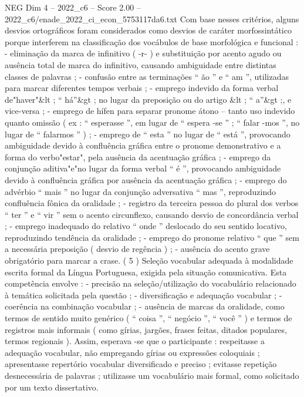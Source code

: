 \begin{textsample}{NEG Dim 4 – 2022\_c6 – Score 2.00 – 2022\_c6/enade\_2022\_ci\_econ\_5753117da6.txt}
Com base nesses critérios, alguns desvios ortográficos foram considerados como desvios de caráter morfossintático porque interferem na classificação dos vocábulos de base morfológica e funcional : - eliminação da marca de infinitivo ( -r- ) e substituição por acento agudo ou ausência total de marca do infinitivo, causando ambiguidade entre distintas classes de palavras ; - confusão entre as terminações “ ão ” e “ am ”, utilizadas para marcar diferentes tempos verbais ; - emprego indevido da forma verbal de"haver"\&lt ; “ há”\&gt ; no lugar da preposição ou do artigo \&lt ; “ a”\&gt ;, e vice-versa ; - emprego de hífen para separar pronome átono – tanto uso indevido quanto omissão ( ex : “ esperasse ”, em lugar de “ espera -se ” ; “ falar -mos ”, no lugar de “ falarmos ” ) ; - emprego de “ esta ” no lugar de “ está ”, provocando ambiguidade devido à confluência gráfica entre o pronome demonstrativo e a forma do verbo"estar", pela ausência da acentuação gráfica ; - emprego da conjunção aditiva"e"no lugar da forma verbal “ é ”, provocando ambiguidade devido à confluência gráfica por ausência da acentuação gráfica ; - emprego do advérbio “ mais ” no lugar da conjunção adversativa “ mas ”, reproduzindo confluência fônica da oralidade ; - registro da terceira pessoa do plural dos verbos “ ter ” e “ vir ” sem o acento circunflexo, causando desvio de concordância verbal ; - emprego inadequado do relativo “ onde ” deslocado do seu sentido locativo, reproduzindo tendência da oralidade ; - emprego do pronome relativo “ que ” sem a necessária preposição ( desvio de regência ) ; - ausência do acento grave obrigatório para marcar a crase. ( 5 ) Seleção vocabular adequada à modalidade escrita formal da Língua Portuguesa, exigida pela situação comunicativa.
Esta competência envolve : - precisão na seleção/utilização do vocabulário relacionado à temática solicitada pela questão ; - diversificação e adequação vocabular ; - coerência na combinação vocabular ; - ausência de marcas da oralidade, como termos de sentido muito genérico ( “ coisa ”, “ negócio ”, “ você ” ) e termos de registros mais informais ( como gírias, jargões, frases feitas, ditados populares, termos regionais ).
Assim, esperava -se que o participante : respeitasse a adequação vocabular, não empregando gírias ou expressões coloquiais ; apresentasse repertório vocabular diversificado e preciso ; evitasse repetição desnecessária de palavras ; utilizasse um vocabulário mais formal, como solicitado por um texto dissertativo.

\end{textsample}
